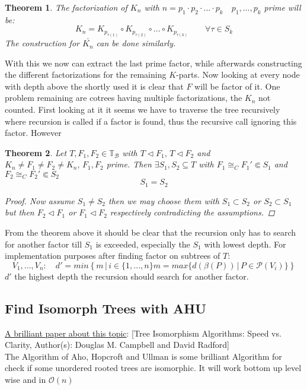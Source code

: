 \documentclass[a4paper,12pt]{article}
\newtheorem{theorem}{Theorem}[section]
\theoremstyle{definition}
\begin{document}
	\begin{theorem}
		The factorization of $K_n$ with $n=p_1\cdot p_2\cdot ...\cdot p_k\quad p_1,...,p_k $ prime will be:
		\[K_n = K_{p_{\tau(1)}} \circ K_{p_{\tau(2)}}\circ ...\circ K_{p_{\tau(k)}}\qquad \forall \tau\in S_k \] 
		The construction for $\bar{K_n}$ can be done similarly.
	\end{theorem}
	With this we now can extract the last prime factor, while afterwards constructing the different factorizations for the remaining $K$-parts. Now looking at every node with depth above the shortly used it is clear that $F$ will be factor of it. One problem remaining are cotrees having multiple factorizations, the $K_n$ not counted. First looking at it it seems we have to traverse the tree recursively where recursion is called if a factor is found, thus the recursive call ignoring this factor. However
	
	\begin{theorem}
		Let $T,F_1,F_2\in \mathds{T}_{\mathcal{B}}$ with $T\triangleleft F_1,\,T\triangleleft F_2$ and $K_n\not=F_1\not = F_2\not= K_n,\, F_1,F_2$ prime.
		Then $\exists S_1,S_2\subseteq T$ with $F_1\cong_C F_1' \Subset S_1$ and $F_2\cong_C F_2' \Subset S_2$
		\[S_1=S_2\]
		\begin{proof}
			Now assume $S_1\not=S_2$ then we may choose them with $S_1 \subset S_2$ or $S_2 \subset S_1$ but then $F_2 \triangleleft F_1$ or $F_1 \triangleleft F_2$ respectively contradicting the assumptions.
		\end{proof}
	\end{theorem}
	From the theorem above it should be clear that the recursion only has to search for another factor till $S_1$ is exceeded, especially the $S_1$ with lowest depth. For implementation purposes after finding factor on subtrees of $T$:\\ \[V_1,...,V_n:\quad d' = min\left\{m\,|\, i\in\{1,...,n\} m=max\{d(\beta(P))\,|\, P\in \mathcal{P}(V_i)\}\right\} \] 
	$d'$ the highest depth the recursion should search for another factor.
	\subsection{Find Isomorph Trees with AHU}
	\hyperlink{www.jstor.org/stable/pdf/2690833.pdf}{A brilliant paper about this topic}: [Tree Isomorphism Algorithms: Speed vs. Clarity,\quad
	Author(s): Douglas M. Campbell and David Radford]\\
	The Algorithm of Aho, Hopcroft and Ullman is some brilliant Algorithm for check if some unordered rooted trees are isomorphic. It will work bottom up level wise and in $\mathcal{O}(n)$
\end{document}
